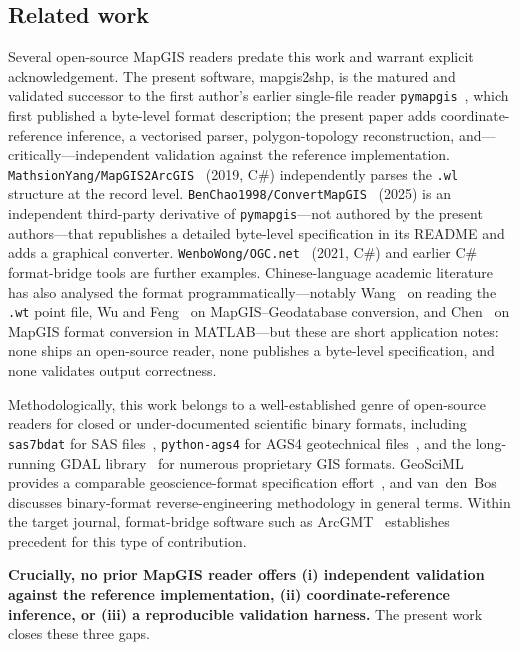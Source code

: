 \documentclass[11pt,a4paper]{article}
\begin{document}
\subsection{Related work}
\label{sec:related}
Several open-source MapGIS readers predate this work and warrant explicit acknowledgement. The present software, mapgis2shp, is the matured and validated successor to the first author's earlier single-file reader \texttt{pymapgis}~\cite{pymapgis2022}, which first published a byte-level format description; the present paper adds coordinate-reference inference, a vectorised parser, polygon-topology reconstruction, and---critically---independent validation against the reference implementation. \texttt{MathsionYang/MapGIS2ArcGIS}~\cite{mathsionyang2019} (2019, C\#) independently parses the \texttt{.wl} structure at the record level. \texttt{BenChao1998/ConvertMapGIS}~\cite{convertmapgis2025} (2025) is an independent third-party derivative of \texttt{pymapgis}---not authored by the present authors---that republishes a detailed byte-level specification in its README and adds a graphical converter. \texttt{WenboWong/OGC.net}~\cite{ogcnet2021} (2021, C\#) and earlier C\# format-bridge tools are further examples. Chinese-language academic literature has also analysed the format programmatically---notably Wang~\cite{wang2013} on reading the \texttt{.wt} point file, Wu and Feng~\cite{wufeng2006} on MapGIS--Geodatabase conversion, and Chen~\cite{chen2000} on MapGIS format conversion in MATLAB---but these are short application notes: none ships an open-source reader, none publishes a byte-level specification, and none validates output correctness.

Methodologically, this work belongs to a well-established genre of open-source readers for closed or under-documented scientific binary formats, including \texttt{sas7bdat} for SAS files~\cite{shotwell2011}, \texttt{python-ags4} for AGS4 geotechnical files~\cite{senanayake2022}, and the long-running GDAL library~\cite{warmerdam2008} for numerous proprietary GIS formats. GeoSciML provides a comparable geoscience-format specification effort~\cite{sen2005}, and van~den~Bos~\cite{vandenbos2014} discusses binary-format reverse-engineering methodology in general terms. Within the target journal, format-bridge software such as ArcGMT~\cite{wright1998} establishes precedent for this type of contribution.

\textbf{Crucially, no prior MapGIS reader offers (i) independent validation against the reference implementation, (ii) coordinate-reference inference, or (iii) a reproducible validation harness.} The present work closes these three gaps.
\end{document}

